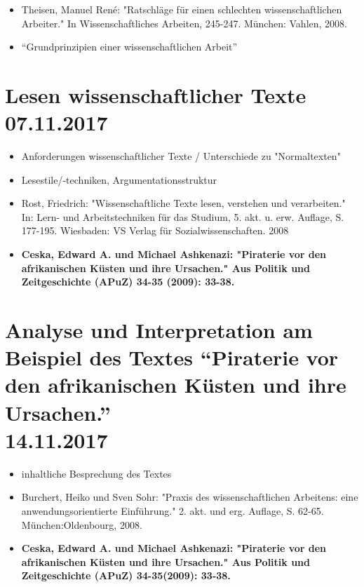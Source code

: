 \documentclass[emulatestandardclasses]{scrartcl}
\begin{document}
\begin{itemize}
  \item Theisen, Manuel René: "Ratschläge für einen schlechten wissenschaftlichen Arbeiter." In Wissenschaftliches Arbeiten, 245-247. München: Vahlen, 2008.
  \item "`Grundprinzipien einer wissenschaftlichen Arbeit"'
\end{itemize}



\section{Lesen wissenschaftlicher Texte\\07.11.2017}

\begin{itemize}
  \item Anforderungen wissenschaftlicher Texte / Unterschiede zu "Normaltexten"
  \item Lesestile/-techniken, Argumentationsstruktur
  \item Rost, Friedrich: "Wissenschaftliche Texte lesen, verstehen und verarbeiten." In: Lern- und Arbeitstechniken für das Studium, 5. akt. u. erw. Auflage, S. 177-195. Wiesbaden: VS Verlag für Sozialwissenschaften. 2008
  \item \textbf{Ceska, Edward A. und Michael Ashkenazi: "Piraterie vor den afrikanischen Küsten und ihre Ursachen." Aus Politik und Zeitgeschichte (APuZ) 34-35 (2009): 33-38.}
\end{itemize}


\section{Analyse und Interpretation am Beispiel des Textes "`Piraterie vor den afrikanischen Küsten und ihre Ursachen."'\\14.11.2017}

\begin{itemize}
  \item inhaltliche Besprechung des Textes
  \item Burchert, Heiko und Sven Sohr: "Praxis des wissenschaftlichen Arbeitens: eine anwendungsorientierte Einführung." 2. akt. und erg. Auflage, S. 62-65. München:Oldenbourg, 2008.
  \item \textbf{Ceska, Edward A. und Michael Ashkenazi: "Piraterie vor den afrikanischen Küsten und ihre Ursachen." Aus Politik und Zeitgeschichte (APuZ) 34-35(2009): 33-38.}
\end{itemize}


\newpage
\end{document}
